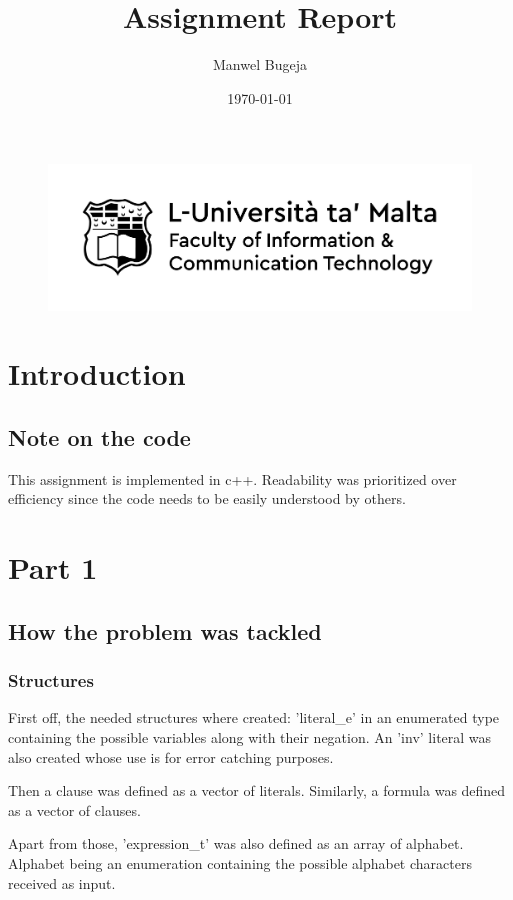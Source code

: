 \documentclass[a4paper, 12pt]{article}
\begin{document}
\begin{figure}
    \centering
    \includegraphics[width=1\textwidth]{Logo}
\end{figure}

\title{Assignment Report}
\author{Manwel Bugeja}
\date{\today}
\maketitle

\tableofcontents
\newpage

\section{Introduction}
\subsection{Note on the code}
This assignment is implemented in c++. Readability was prioritized over efficiency since the code needs to be
easily understood by others. 

\section{Part 1}
\subsection{How the problem was tackled}
\subsubsection{Structures}
First off, the needed structures where created: 'literal\_e' in an enumerated type containing the possible variables along with their negation.
An 'inv' literal was also created whose use is for error catching purposes.

Then a clause was defined as a vector of literals. Similarly, a formula was defined as a vector of clauses.

Apart from those, 'expression\_t' was also defined as an array of alphabet. Alphabet being an enumeration
containing the possible alphabet characters received as input.
\end{document}
